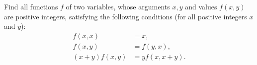 Find all functions $f$ of two variables, whose arguments $x,y$ and values $f(x,y)$ are positive integers, satisfying the following conditions (for all positive integers $x$ and $y$):\begin{align*} f(x,x)& =x,\\ f(x,y)& =f(y,x),\\ (x+y)f(x,y)& =yf(x,x+y).\end{align*}